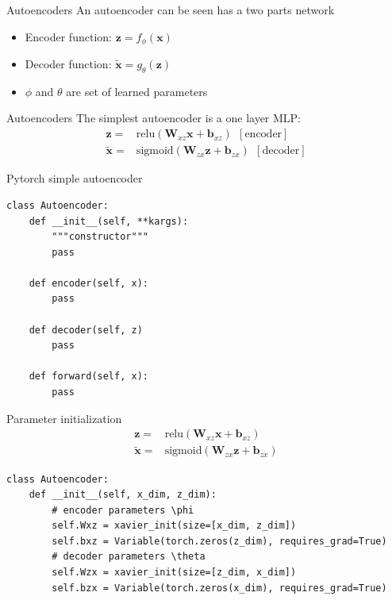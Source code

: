 \documentclass{beamer}
\newcommand{\relu}{\mathrm{relu}}
\newcommand{\sig}{\mathrm{sigmoid}}
\begin{document}
\begin{frame}{Autoencoders}
An autoencoder can be seen has a two parts network
\begin{itemize}
	\item Encoder function: $\bm{z}=f_\phi(\bm{x})$
	\item Decoder function: $\tilde{\bm{x}} = g_\theta(\bm{z})$
	\item $\phi$ and $\theta$ are set of learned parameters
\end{itemize}
\end{frame}

\begin{frame}{Autoencoders}
	The simplest autoencoder is a one layer MLP:
	\Large
	\begin{equation}
	\begin{split}
		\mathbf{z} =& \relu\left(\mathbf{W}_{xz}\mathbf{x}+\mathbf{b}_{xz}\right)~~[\text{encoder}]\\
		\tilde{\mathbf{x}} =& \sig\left(\mathbf{W}_{zx}\mathbf{z}+\mathbf{b}_{zx}\right)~~[\text{decoder}]
	\end{split}
	\end{equation}
\end{frame}

\begin{frame}[fragile]{Pytorch simple autoencoder}
\begin{verbatim}
class Autoencoder:
	def __init__(self, **kargs):
	    """constructor"""
	    pass
	
	def encoder(self, x):
	    pass
	
	def decoder(self, z)
	    pass
	    
	def forward(self, x):
	    pass
\end{verbatim}
\end{frame}

\begin{frame}[fragile]{Parameter initialization}
\begin{equation}
\begin{split}
\mathbf{z} =& \relu\left(\mathbf{W}_{xz}\mathbf{x}+\mathbf{b}_{xz}\right)\\
\tilde{\mathbf{x}} =& \sig\left(\mathbf{W}_{zx}\mathbf{z}+\mathbf{b}_{zx}\right) 
\end{split}
\end{equation}
\begin{verbatim}
class Autoencoder:
    def __init__(self, x_dim, z_dim):
        # encoder parameters \phi
        self.Wxz = xavier_init(size=[x_dim, z_dim])
        self.bxz = Variable(torch.zeros(z_dim), requires_grad=True)
        # decoder parameters \theta
        self.Wzx = xavier_init(size=[z_dim, x_dim])
        self.bzx = Variable(torch.zeros(x_dim), requires_grad=True)
\end{verbatim}
\end{frame}
\end{document}
